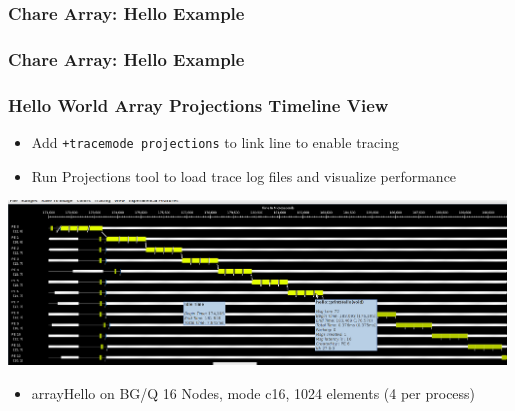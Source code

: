 \begin{frame}[fragile]
  \frametitle{Chare Array: Hello Example }
  
\end{frame}

\begin{frame}[fragile]
  \frametitle{Chare Array: Hello Example }
  
\end{frame}

\begin{frame}[fragile]
   \frametitle{Hello World Array Projections Timeline View}\scriptsize
  \begin{itemize}
    \item Add \texttt{+tracemode projections} to link line to enable tracing
    \item Run Projections tool to load trace log files and visualize performance
  \end{itemize}
  \begin{center} \includegraphics[width=0.99\textwidth]{figures/arrayHelloTimeline} \end{center}
  \begin{itemize}
    \item arrayHello on BG/Q 16 Nodes, mode c16, 1024 elements (4 per process)
  \end{itemize}
\end{frame}


